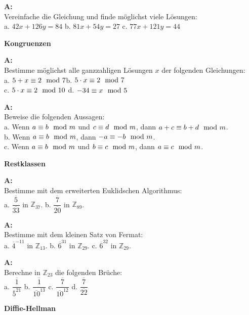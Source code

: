 \documentclass[landscape,twocolumn,a4paper]{article}
\begin{document}
 
 \textbf{A:}   \\
Vereinfache die Gleichung und finde möglichst viele Lösungen: \\
a.   $42x+126y=84$ \quad b. $81x+54y=27$ \quad 
 c. $77x+121y=44$ 
 \bigskip {}

 
 \textbf{Kongruenzen} \bigskip
 
\textbf{A:}   \\
Bestimme möglichst alle ganzzahligen Lösungen $x$ der folgenden
  Gleichungen: \\
a. $5+x\equiv2\mod7$\quad b.   $5\cdot x\equiv2\mod7$ \\ 
c. $5\cdot x\equiv2\mod10$  \quad d.  $-34\equiv x\mod5$
\bigskip {}

\textbf{A:}   \\
Beweise die folgenden Aussagen:\\
a. Wenn $a\equiv b\mod m$ und $c\equiv d\mod m$, dann
    $a+c\equiv b+d\mod m$. \\
b. Wenn $a\equiv b\mod m$, dann $-a\equiv-b\mod m$. \\
c. Wenn $a\equiv b\mod m$ und $b\equiv c\mod m$, dann
    $a\equiv c\mod m$.
\bigskip {}

 \textbf{Restklassen} \bigskip

\textbf{A:}   \\
Bestimme mit dem erweiterten Euklidschen Algorithmus: \\
 a.  $\dfrac{\overline{5}}{\overline{33}}$ in  $\mathbb{Z}_{37}$. \quad
 b.  $\dfrac{\overline{7}}{\overline{20}}$ in  $\mathbb{Z}_{89}$.
\bigskip {}

\textbf{A:}   \\
Bestimme mit dem kleinen Satz von Fermat: \\
 a.  $\overline{4}^{-11}$ in  $\mathbb{Z}_{13}$. \quad
 b.  $\overline{6}^{31}$ in  $\mathbb{Z}_{29}$. \quad
 c.  $ \overline{6}^{32}$ in  $\mathbb{Z}_{29}$. 
\bigskip {}

\textbf{A:}   \\
Berechne in $\mathbb{Z}_{23}$ die folgenden Brüche: \\
a.  $\dfrac{\overline{1}}{\overline{5}^{21}} $ \quad
b.  $\dfrac{\overline{1}}{\overline{10}^{13}} $ \quad
c.  $\dfrac{\overline{7}}{\overline{10}^{12}} $ \quad
d.  $\dfrac{\overline{7}}{\overline{22}} $ \quad
\bigskip {}

\textbf{Diffie-Hellman} \bigskip
\end{document}
